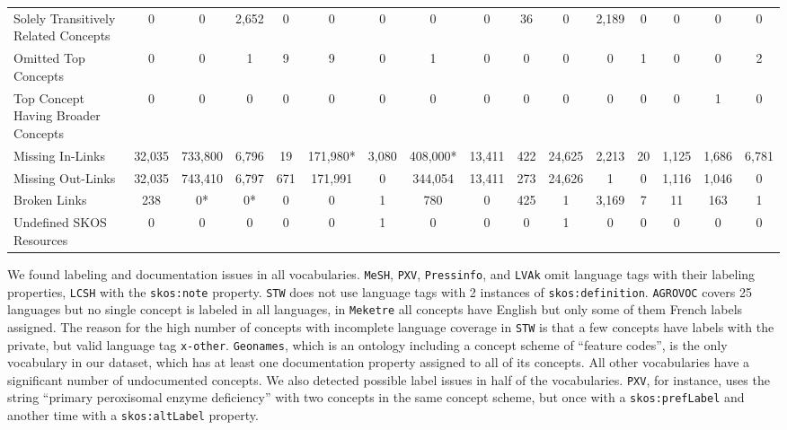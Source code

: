 \begin{table}[h]
\begin{center}
{\begin{tabular}{lccccccccccccccc}
Solely Transitively Related Concepts & 0 & 0 & 2,652 & 0 & 0 & 0 & 0 & 0 & 36 & 0 & 2,189 & 0 & 0 & 0 & 0 \\

Omitted Top Concepts & 0 & 0 & 1 & 9 & 9 & 0 & 1 & 0 & 0 & 0 & 0 & 1 & 0 & 0 & 2 \\

Top Concept Having Broader Concepts & 0 & 0 & 0 & 0 & 0 & 0 & 0 & 0 & 0 & 0 & 0 & 0 & 0 & 1 & 0 \\

\midrule

Missing In-Links & 32,035 & 733,800 & 6,796 & 19 & 171,980* & 3,080 & 408,000* & 13,411 & 422 & 24,625 & 2,213 & 20 & 1,125 & 1,686 & 6,781 \\

Missing Out-Links & 32,035 & 743,410 & 6,797 & 671 & 171,991 & 0 & 344,054 & 13,411 & 273 & 24,626 & 1 & 0 & 1,116 & 1,046 & 0 \\

Broken Links & 238 & 0* & 0* & 0 & 0 & 1 & 780 & 0 & 425 & 1 & 3,169 & 7 & 11 & 163 & 1 \\

Undefined SKOS Resources & 0 & 0 & 0 & 0 & 0 & 1 & 0 & 0 & 0 & 1 & 0 & 0 & 0 & 0 & 0 \\

\bottomrule
\end{tabular}
}
\end{center}
\end{table}

We found labeling and documentation issues in all vocabularies.
\texttt{MeSH}, \texttt{PXV}, \texttt{Pressinfo}, and \texttt{LVAk} omit language tags with their labeling properties, \texttt{LCSH} with the \texttt{skos:note} property. \texttt{STW} does not use language tags with 2 instances of \texttt{skos:definition}.
\texttt{AGROVOC} covers 25 languages but no single concept is labeled in all languages, in \texttt{Meketre} all concepts have English but only some of them French labels assigned. The reason for the high number of concepts with incomplete language coverage in \texttt{STW} is that a few concepts have labels with the private, but valid language tag \texttt{x-other}. 
\texttt{Geonames}, which is an ontology including a concept scheme of ``feature codes'', is the only vocabulary in our dataset, which has at least one documentation property assigned to all of its concepts. All other vocabularies have a significant number of undocumented concepts.
We also detected possible label issues in half of the vocabularies. \texttt{PXV}, for instance, uses the string ``primary peroxisomal enzyme deficiency'' with two concepts in the same concept scheme, but once with a \texttt{skos:prefLabel} and another time with a \texttt{skos:altLabel} property.

